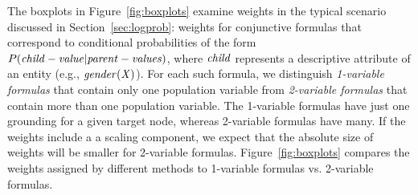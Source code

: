 \documentclass[twoside,leqno,twocolumn]{article}
\begin{document}
%
%
%
%

The boxplots in Figure~\ref{fig:boxplots} examine weights in the typical scenario discussed in Section~\ref{sec:logprob}: weights for conjunctive formulas that correspond to conditional probabilities of the form $P(\it{child-value}|\it{parent-values})$, where $\it{child}$ represents a descriptive attribute of an entity (e.g., $\it{gender}(X)$). For each such formula, we distinguish {\em 1-variable formulas} that contain only one population variable %
from {\em 2-variable formulas} that contain more than one population variable.
The 1-variable formulas have just one grounding for a given target node, whereas 2-variable formulas have many. If the weights include a a scaling component, we expect that the absolute size of weights will be smaller for 2-variable formulas.  Figure~\ref{fig:boxplots} compares the weights assigned by different methods to 1-variable formulas vs. 2-variable formulas.
\end{document}
